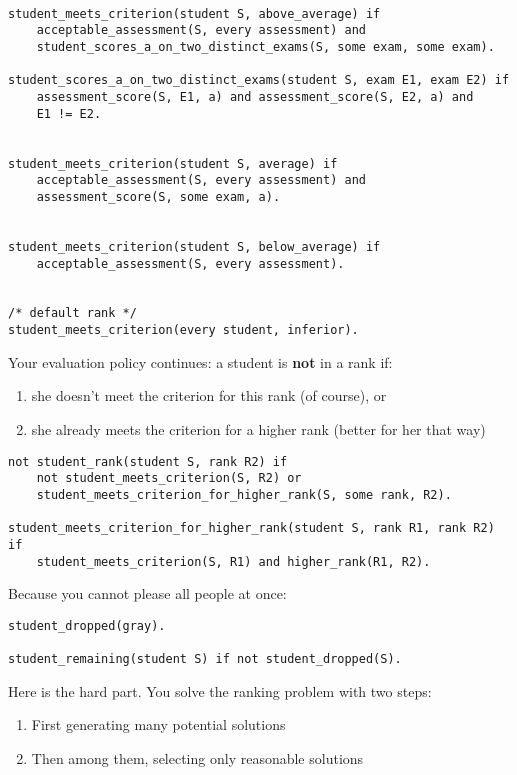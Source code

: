 \documentclass[letterpaper,10pt]{article}
\begin{document}
\begin{flushleft}
\begin{verbatim}
    
student_meets_criterion(student S, above_average) if
    acceptable_assessment(S, every assessment) and
    student_scores_a_on_two_distinct_exams(S, some exam, some exam).
    
student_scores_a_on_two_distinct_exams(student S, exam E1, exam E2) if
    assessment_score(S, E1, a) and assessment_score(S, E2, a) and
    E1 != E2.
    
    
student_meets_criterion(student S, average) if
    acceptable_assessment(S, every assessment) and
    assessment_score(S, some exam, a).

    
student_meets_criterion(student S, below_average) if
    acceptable_assessment(S, every assessment).

    
/* default rank */
student_meets_criterion(every student, inferior).
\end{verbatim}

\pagebreak

Your evaluation policy continues: a student is \textbf{not} in a rank if:
\begin{enumerate}
\item
she doesn't meet the criterion for this rank (of course), or
\item
she already meets the criterion for a higher rank (better for her that way)
\end{enumerate}

\begin{verbatim}
not student_rank(student S, rank R2) if
    not student_meets_criterion(S, R2) or
    student_meets_criterion_for_higher_rank(S, some rank, R2).
    
student_meets_criterion_for_higher_rank(student S, rank R1, rank R2) if
    student_meets_criterion(S, R1) and higher_rank(R1, R2).
\end{verbatim}

Because you cannot please all people at once:
\begin{verbatim}
student_dropped(gray).

student_remaining(student S) if not student_dropped(S).
\end{verbatim}

Here is the hard part. You solve the ranking problem with two steps:
\begin{enumerate}
\item
First generating many potential solutions
\item
Then among them, selecting only reasonable solutions
\end{enumerate}


\end{flushleft}
\end{document}

